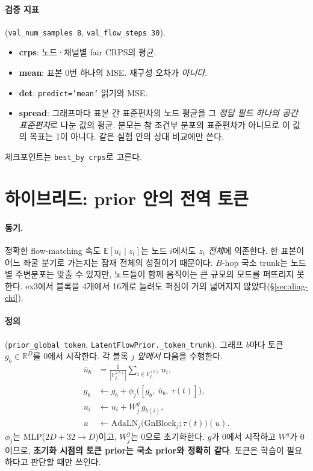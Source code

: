 \documentclass[11pt]{article}
\newcommand{\E}{\mathbb{E}}
\newcommand{\R}{\mathbb{R}}
\newcommand{\code}[1]{\texttt{#1}}
\begin{document}
\paragraph{검증 지표}(\code{val\_num\_samples 8}, \code{val\_flow\_steps 30}).
\begin{itemize}
\item \textbf{crps}: 노드·채널별 fair CRPS의 평균.
\item \textbf{mean}: 표본 0번 하나의 MSE. 재구성 오차가 \emph{아니다}.
\item \textbf{det}: \code{predict='mean'} 읽기의 MSE.
\item \textbf{spread}: 그래프마다 표본 간 표준편차의 노드 평균을 그
  \emph{정답 필드 하나의 공간 표준편차}로 나눈 값의 평균. 분모는 참 조건부
  분포의 표준편차가 아니므로 이 값의 목표는 1이 아니다. 같은 실험 안의 상대
  비교에만 쓴다.
\end{itemize}
체크포인트는 \code{best\_by crps}로 고른다.

\section{하이브리드: prior 안의 전역 토큰}\label{sec:token}

\paragraph{동기.} 정확한 flow-matching 속도 $\E[u_t\mid z_t]$는 노드 $i$에서도
$z_t$ \emph{전체}에 의존한다. 한 표본이 어느 좌굴 분기로 가는지는 잠재 전체의
성질이기 때문이다. $B$-hop 국소 trunk는 노드별 주변분포는 맞출 수 있지만,
노드들이 함께 움직이는 큰 규모의 모드를 퍼뜨리지 못한다. ex3에서 블록을
4개에서 16개로 늘려도 퍼짐이 거의 넓어지지 않았다(\S\ref{sec:diag-chi}).

\paragraph{정의} (\code{prior\_global token}, \code{LatentFlowPrior.\_token\_trunk}).
그래프 $b$마다 토큰 $g_b\in\R^D$를 0에서 시작한다. 각 블록 $j$ \emph{앞에서}
다음을 수행한다.
\begin{align}
  \bar u_b &= \frac{1}{|V_L^{(b)}|}\sum_{i\in V_L^{(b)}} u_i, \\
  g_b &\leftarrow g_b + \phi_j\bigl([g_b,\ \bar u_b,\ \tau(t)]\bigr), \\
  u_i &\leftarrow u_i + W^{g}_j\, g_{b(i)}, \\
  u &\leftarrow \mathrm{AdaLN}_j\bigl(\mathrm{GnBlock}_j;\tau(t)\bigr)(u).
\end{align}
$\phi_j$는 MLP($2D+32\to D$)이고, $W^{g}_j$는 0으로 초기화한다. $g$가 0에서
시작하고 $W^{g}$가 0이므로, \textbf{초기화 시점의 토큰 prior는 국소 prior와
정확히 같다}. 토큰은 학습이 필요하다고 판단할 때만 쓰인다.
\end{document}
